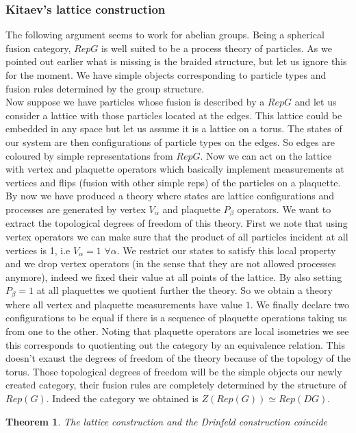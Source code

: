 \documentclass{article}
\newtheorem{theorem}{Theorem}[section]
\begin{document}
\subsubsection{Kitaev's lattice construction}
The following argument seems to work for abelian groups.
Being a spherical fusion category, $RepG$ is well suited to be a process theory of particles. As we pointed out earlier what is missing is the braided structure, but let us ignore this for the moment. We have simple objects corresponding to particle types and fusion rules determined by the group structure.\\
Now suppose we have particles whose fusion is described by a $RepG$ and let us consider a lattice with those particles located at the edges. This lattice could be embedded in any space but let us assume it is a lattice on a torus. The states of our system are then configurations of particle types on the edges. So edges are coloured by simple representations from $RepG$. Now we can act on the lattice with vertex and plaquette operators which basically implement measurements at vertices and flips (fusion with other simple reps) of the particles on a plaquette. By now we have produced a theory where states are lattice configurations and processes are generated by vertex $V_\alpha$ and plaquette $P_\beta$ operators. We want to extract the topological degrees of freedom of this theory. First we note that using vertex operators we can make sure that the product of all particles incident at all vertices is 1, i.e $V_\alpha=1$ $\forall \alpha$. We restrict our states to satisfy this local property and we drop vertex operators (in the sense that they are not allowed processes anymore), indeed we fixed their value at all points of the lattice. By also setting $P_\beta =1$ at all plaquettes we quotient further the theory. So we obtain a theory where all vertex and plaquette measurements have value $1$. We finally declare two configurations to be equal if there is a sequence of plaquette operations taking us from one to the other. Noting that plaquette operators are local isometries we see this corresponds to quotienting out the category by an equivalence relation. This doesn't exaust the degrees of freedom of the theory because of the topology of the torus. Those topological degrees of freedom will be the simple objects our newly created category, their fusion rules are completely determined by the structure of $Rep(G)$. Indeed the category we obtained is $Z(Rep(G)) \simeq Rep(DG)$.

\begin{theorem}
The lattice construction and the Drinfeld construction coincide
\end{theorem}
\end{document}

